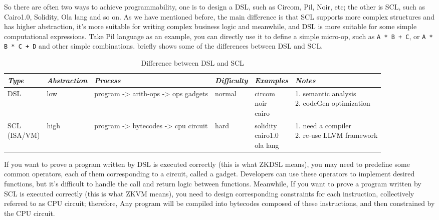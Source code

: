 So there are often two ways to achieve programmability, one is to design a DSL, such as Circom\cite{website:Circom}, Pil\cite{website:Pil}, Noir\cite{website:Noir}, etc; the other is SCL, 
such as Cairo1.0\cite{website:Cairo1.0}, Solidity\cite{website:Solidity}, Ola lang\cite{website:Ola-lang} and so on. As we have mentioned before, the main difference is that SCL supports more complex structures and has 
higher abstraction, it's more suitable for writing complex business logic and meanwhile, and DSL is more suitable for some simple computational expressions. 
Take Pil\cite{website:Pil} language as an example, you can directly use it to define a simple micro-op, such as \verb|A * B + C|, or \verb|A * B * C + D| and other simple combinations. 
 briefly shows some of the differences between DSL and SCL.

\begin{table}[!ht]
    \centering
    \begin{tabular}{|l|l|l|l|l|l|}
        \hline
        \emph{Type} & \emph{Abstraction} & \emph{Process} & \emph{Difficulty} & \emph{Examples} & \emph{Notes} \\ 
        \hline
        DSL & low & program -> arith-ops -> ops gadgets & normal & \makecell{circom \\ noir \\ cairo} & \makecell{1. semantic analysis \\ 2. codeGen optimization} \\
        \hline
        \makecell{SCL \\ (ISA/VM)} & high & program -> bytecodes -> cpu circuit & hard & \makecell{solidity \\ cairo1.0 \\ ola lang} & \makecell{1. need a compiler \\2. re-use LLVM framework} \\
        \hline
    \end{tabular}
    \caption{Difference between DSL and SCL}
    \label{table:Difference between DSL and SCL}
\end{table}

If you want to prove a program written by DSL is executed correctly (this is what ZKDSL means), you may need to predefine some common operators, each of them corresponding to a circuit, called a gadget\cite{website:Gadget}. 
Developers can use these operators to implement desired functions, but it's difficult to handle the call and return logic between functions. Meanwhile, If you want to prove a program written by SCL is executed correctly (this is what ZKVM means), 
 you need to design corresponding constraints for each instruction, collectively referred to as CPU circuit; therefore, Any program will be compiled into 
 bytecodes composed of these instructions, and then constrained by the CPU circuit.

